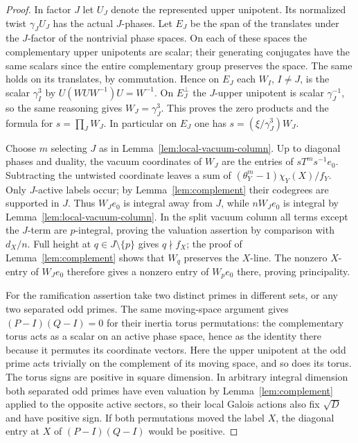 \documentclass[11pt,a4paper]{article}
\numberwithin{equation}{section}
\theoremstyle{remark}
\begin{document}
\begin{proof}
In factor $J$ let $U_J$ denote the represented upper unipotent. Its
normalized twist $\gamma_J U_J$ has the actual $J$-phases. Let $E_J$
be the span of the translates under the $J$-factor of the nontrivial
phase spaces. On each of these spaces the complementary upper
unipotents are scalar; their generating conjugates have the same
scalars since the entire complementary group preserves the space.
The same holds on its translates, by commutation. Hence on $E_J$
each $W_I$, $I\ne J$, is the scalar $\gamma_I^3$ by
$U(WUW^{-1})U=W^{-1}$. On $E_J^\perp$ the $J$-upper unipotent is
scalar $\gamma_J^{-1}$, so the same reasoning gives $W_J=\gamma_J^3$.
This proves the zero products and the formula for
$s=\prod_J W_J$. In particular on $E_J$ one has
$s=(\xi/\gamma_J^3)W_J$.

Choose $m$ selecting $J$ as in Lemma~\ref{lem:local-vacuum-column}.
Up to diagonal phases and duality, the vacuum coordinates of $W_J$
are the entries of $sT^m s^{-1}e_0$. Subtracting the untwisted
coordinate leaves a sum of $(\theta_Y^m-1)\chi_Y(X)/f_Y$.
Only $J$-active labels occur; by Lemma~\ref{lem:complement} their
codegrees are supported in $J$. Thus $W_Je_0$ is integral away from
$J$, while $nW_Je_0$ is integral by Lemma~\ref{lem:local-vacuum-column}.
In the split vacuum column all terms except the $J$-term are
$p$-integral, proving the valuation assertion by comparison with
$d_X/n$. Full height at $q\in J\setminus\{p\}$ gives $q\nmid f_X$;
the proof of Lemma~\ref{lem:complement} shows that $W_q$ preserves
the $X$-line. The nonzero $X$-entry of $W_J e_0$ therefore gives a
nonzero entry of $W_p e_0$ there, proving principality.

For the ramification assertion take two distinct primes in different
sets, or any two separated odd primes. The same moving-space argument
gives $(P-I)(Q-I)=0$ for their inertia torus permutations: the
complementary torus acts as a scalar on an active phase space,
hence as the identity there because it permutes its coordinate vectors.
Here the upper unipotent at the odd prime acts trivially on the
complement of its moving space, and so does its torus. The torus signs
are positive in square dimension. In arbitrary
integral dimension both separated odd primes have even valuation by
Lemma~\ref{lem:complement} applied to the opposite active sectors, so
their local Galois actions also fix $\sqrt D$ and have positive sign.
If both permutations moved the label $X$, the diagonal entry
at $X$ of $(P-I)(Q-I)$ would be positive.
\end{proof}
\end{document}
